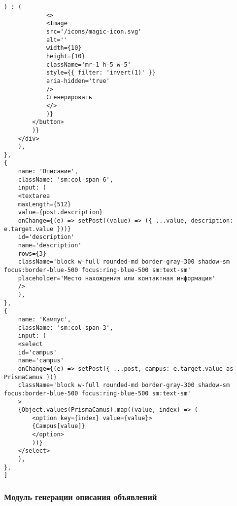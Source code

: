 \begin{lstlisting}[caption={Реализация бесконечной ленты}, label=lst:scroll]
			) : (
			<>
			<Image
			src='/icons/magic-icon.svg'
			alt=''
			width={10}
			height={10}
			className='mr-1 h-5 w-5'
			style={{ filter: 'invert(1)' }}
			aria-hidden='true'
			/>
			Сгенерировать
			</>
			)}
		</button>
		)}
	</div>
	),
},
{
	name: 'Описание',
	className: 'sm:col-span-6',
	input: (
	<textarea
	maxLength={512}
	value={post.description}
	onChange={(e) => setPost((value) => ({ ...value, description: e.target.value }))}
	id='description'
	name='description'
	rows={3}
	className='block w-full rounded-md border-gray-300 shadow-sm focus:border-blue-500 focus:ring-blue-500 sm:text-sm'
	placeholder='Место нахождения или контактная информация'
	/>
	),
},
{
	name: 'Кампус',
	className: 'sm:col-span-3',
	input: (
	<select
	id='campus'
	name='campus'
	onChange={(e) => setPost({ ...post, campus: e.target.value as PrismaCamus })}
	className='block w-full rounded-md border-gray-300 shadow-sm focus:border-blue-500 focus:ring-blue-500 sm:text-sm'
	>
	{Object.values(PrismaCamus).map((value, index) => (
		<option key={index} value={value}>
		{Campus[value]}
		</option>
		))}
	</select>
	),
},
]
\end{lstlisting}

\subsubsection{Модуль генерации описания объявлений}

